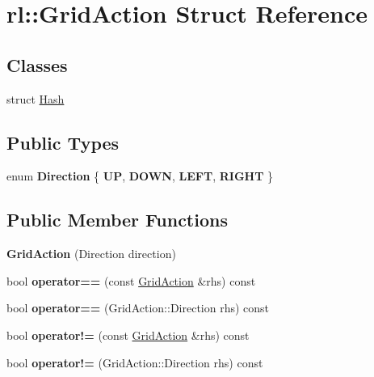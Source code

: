 \hypertarget{structrl_1_1_grid_action}{}\section{rl\+:\+:Grid\+Action Struct Reference}
\label{structrl_1_1_grid_action}
\subsection*{Classes}
\begin{DoxyCompactItemize}
\item 
struct \hyperlink{structrl_1_1_grid_action_1_1_hash}{Hash}
\end{DoxyCompactItemize}
\subsection*{Public Types}
\begin{DoxyCompactItemize}
\item 
\hypertarget{structrl_1_1_grid_action_ab3b4b1b32a2a67afaf9c88bbe0527bb4}{}\label{structrl_1_1_grid_action_ab3b4b1b32a2a67afaf9c88bbe0527bb4} 
enum {\bfseries Direction} \{ {\bfseries UP}, 
{\bfseries D\+O\+WN}, 
{\bfseries L\+E\+FT}, 
{\bfseries R\+I\+G\+HT}
 \}
\end{DoxyCompactItemize}
\subsection*{Public Member Functions}
\begin{DoxyCompactItemize}
\item 
\hypertarget{structrl_1_1_grid_action_a296852f3774647b0b01c8cc500ced6ce}{}\label{structrl_1_1_grid_action_a296852f3774647b0b01c8cc500ced6ce} 
{\bfseries Grid\+Action} (Direction direction)
\item 
\hypertarget{structrl_1_1_grid_action_a993b14ba6d901d7174fe858ae558ef86}{}\label{structrl_1_1_grid_action_a993b14ba6d901d7174fe858ae558ef86} 
bool {\bfseries operator==} (const \hyperlink{structrl_1_1_grid_action}{Grid\+Action} \&rhs) const
\item 
\hypertarget{structrl_1_1_grid_action_a6ab02d4c6b0a70a83a8314429a33a176}{}\label{structrl_1_1_grid_action_a6ab02d4c6b0a70a83a8314429a33a176} 
bool {\bfseries operator==} (Grid\+Action\+::\+Direction rhs) const
\item 
\hypertarget{structrl_1_1_grid_action_aaf50dbc60d9edd2a70ade6cf57ff3965}{}\label{structrl_1_1_grid_action_aaf50dbc60d9edd2a70ade6cf57ff3965} 
bool {\bfseries operator!=} (const \hyperlink{structrl_1_1_grid_action}{Grid\+Action} \&rhs) const
\item 
\hypertarget{structrl_1_1_grid_action_a0a756c56914915daa2cf201e009cea22}{}\label{structrl_1_1_grid_action_a0a756c56914915daa2cf201e009cea22} 
bool {\bfseries operator!=} (Grid\+Action\+::\+Direction rhs) const
\end{DoxyCompactItemize}
